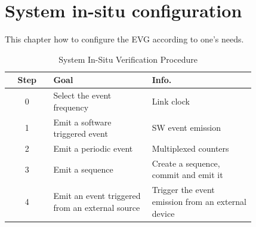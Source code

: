 \documentclass[11pt
  , a4paper
  , article
  , oneside
  , showtrims
]{memoir}
\begin{document}
\newpage
\chapter{System in-situ configuration}
This chapter how to configure the EVG according to one's needs.
\begin{table}[!htb]
  \centering
  \begin{tabular}{c|p{0.4\linewidth}|p{0.42\linewidth}}
    \toprule
    Step & Goal                                            & Info.                                                 \\\midrule
    0    & Select the event frequency                      & Link clock                                            \\\midrule
    1    & Emit a software triggered event                 & SW event emission                                     \\\midrule
    2    & Emit a periodic event                           & Multiplexed counters                                  \\\midrule
    3    & Emit a sequence                                 & Create a sequence, commit and emit it                 \\\midrule
    4    & Emit an event triggered from an external source & Trigger the event emission from an external device    \\\bottomrule
  \end{tabular}
  \caption[]{System In-Situ Verification Procedure}
  \label{table:checklist}
\end{table}
\end{document}
